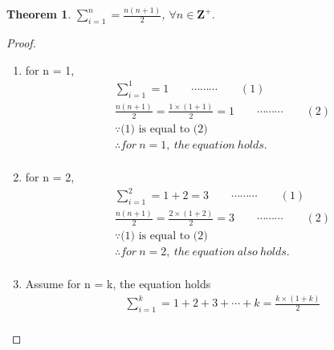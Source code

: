 \documentclass {amsart}
\begin{document}
	\newtheorem {thm}{Theorem}
	\begin {thm}
		$\displaystyle\sum_{i=1}^{n} = \frac{n(n+1)}{2}$, $\forall n \in \mathbf{Z}^+$.
	\end {thm}

	\begin {proof}
	\ \\
	\begin {enumerate}
		\item{for n = 1,}
		\begin {align*}
			& \displaystyle\sum_{i=1}^{1} = 1 \qquad \cdots \cdots \cdots \qquad (1)\\[12pt]
			& \frac{n(n+1)}{2} = \frac{1 \times (1+1)}{2}=1 \qquad \cdots \cdots \cdots \qquad (2)\\[12pt]
			& \because \text{(1) is equal to (2)}\\[12pt]
			& \therefore for\ n = 1,\ the\ equation\ holds.\\[12pt]
		\end {align*}
		
		\item{for n = 2,}
		\begin {align*}
			& \displaystyle\sum_{i=1}^{2} = 1 + 2 = 3 \qquad \cdots \cdots \cdots \qquad (1)\\[12pt]
			& \frac{n(n+1)}{2} = \frac{2 \times (1+2)}{2}=3 \qquad \cdots \cdots \cdots \qquad (2)\\[12pt]
			& \because \text{(1) is equal to (2)}\\[12pt]
			& \therefore for\ n = 2,\ the\ equation\ also\ holds.\\[12pt]
		\end {align*}
		
		\item{ Assume for n = k, the equation holds}
		\begin {align*}
			& \displaystyle\sum_{i=1}^{k} = 1 + 2 + 3 + \cdots + k = \frac{k \times (1+k)}{2}\\[12pt]
		\end {align*}
	\end {enumerate}
	\end {proof}
\end{document}
